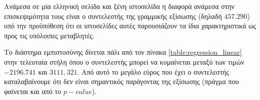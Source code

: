 \documentclass{assignment}
\begin{document}
\begin{Assignment}[Μέρος Γ]


Ανάμεσα σε μία ελληνική σελίδα και ξένη ιστοσελίδα η διαφορά ανάμεσα στην επισκεψιμότητα τους είναι ο συντελεστής  της γραμμικής εξίσωσης (δηλαδή $457.290$) υπό την προϋπόθεση ότι οι ιστοσελίδες αυτές παρουσιάζουν τα ίδια χαρακτηριστικά ως προς τις υπόλοιπες μεταβλητές.

Το διάστημα εμπιστοσύνης δίνεται πάλι από τον πίνακα \ref{table:regression_linear} στην τελευταία στήλη όπου ο συντελεστής  μπορεί να κυμαίνεται μεταξύ των τιμών $-2196.741$ και $3111,321$. Από αυτό το μεγάλο εύρος που έχει ο συντελεστής καταλαβαίνουμε ότι δεν είναι σημαντικός παράγοντας της εξίσωσης (πράγμα που φαίνεται και από το $p-value$).

\end{Assignment}

\clearpage
\end{document}
